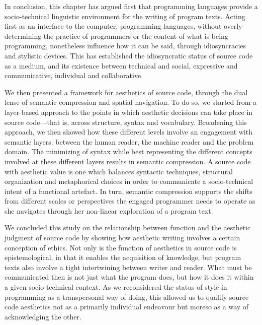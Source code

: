 \spacer

In conclusion, this chapter has argued first that programming languages provide a socio-technical linguistic environment for the writing of program texts. Acting first as an interface to the computer, programming languages, without overly-determining the practice of programmers or the content of what is being programming, nonetheless influence how it can be said, through idiosyncracies and stylistic devices. This has established the idiosyncratic status of source code as a medium, and its existence between technical and social, expressive and communicative, individual and collaborative.

We then presented a framework for aesthetics of source code, through the dual lense of semantic compression and spatial navigation. To do so, we started from a layer-based approach to the points in which aesthetic decisions can take place in source code—that is, across structure, syntax and vocabulary. Broadening this approach, we then showed how these different levels involve an engagement with semantic layers: between the human reader, the machine reader and the problem domain. The minimizing of syntax while best representing the different concepts involved at these different layers results in semantic compression. A source code with aesthetic value is one which balances syntactic techniques, structural organization and metaphorical choices in order to communicate a socio-technical intent of a functional artefact. In turn, semantic compression supports the shifts from different scales or perspectives the engaged programmer needs to operate as she navigates through her non-linear exploration of a program text.

We concluded this study on the relationship between function and the aesthetic judgment of source code by showing how aesthetic writing involves a certain conception of ethics. Not only is the function of aesthetics in source code is epistemological, in that it enables the acquisition of knowledge, but program texts also involve a tight intertwining  between writer and reader. What must be communicated then is not just what the program does, but how it does it within a given socio-technical context. As we reconsidered the status of style in programming as a transpersonal way of doing, this allowed us to qualify source code aesthetics not as a primarily individual endeavour but moreso as a way of acknowledging the other.